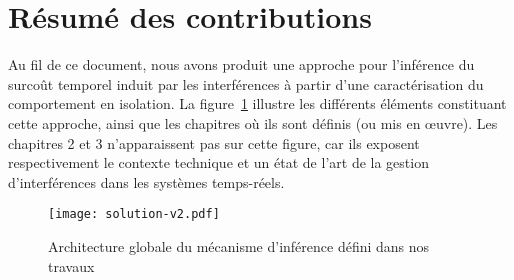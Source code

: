 
\section{Résumé des contributions}

Au fil de ce document, nous avons produit une approche pour l'inférence du surcoût temporel induit par les interférences à partir d'une caractérisation du comportement en isolation.
La figure~\ref{fig:solution} illustre les différents éléments constituant cette approche, ainsi que les chapitres où ils sont définis (ou mis en œuvre).
Les chapitres 2 et 3 n'apparaissent pas sur cette figure, car ils exposent respectivement le contexte technique et un état de l'art de la gestion d'interférences dans les systèmes temps-réels.

\begin{figure}
	\centering
	\texttt{[image: solution-v2.pdf]}
	\caption{\label{fig:solution}Architecture globale du mécanisme d'inférence défini dans nos travaux}
\end{figure}

